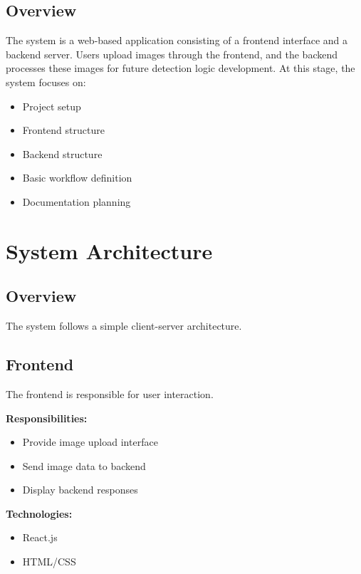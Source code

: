 \documentclass[12pt]{article}
\begin{document}
\subsection{Overview}

The system is a web-based application consisting of a frontend interface and a backend server. Users upload images through the frontend, and the backend processes these images for future detection logic development. At this stage, the system focuses on:
\begin{itemize}[noitemsep]
    \item Project setup
    \item Frontend structure
    \item Backend structure
    \item Basic workflow definition
    \item Documentation planning
\end{itemize}

\section{System Architecture}

\subsection{Overview}

The system follows a simple client-server architecture.

\subsection{Frontend}

The frontend is responsible for user interaction.

\textbf{Responsibilities:}
\begin{itemize}[noitemsep]
    \item Provide image upload interface
    \item Send image data to backend
    \item Display backend responses
\end{itemize}

\textbf{Technologies:}
\begin{itemize}[noitemsep]
    \item React.js
    \item HTML/CSS
\end{itemize}
\end{document}

